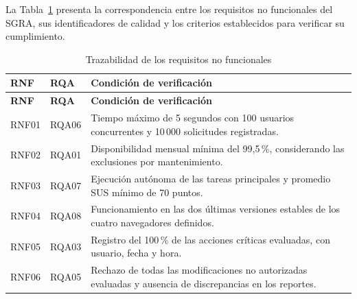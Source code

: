 La Tabla~\ref{tab:trazabilidad-rnf} presenta la correspondencia
entre los requisitos no funcionales del SGRA, sus identificadores
de calidad y los criterios establecidos para verificar su cumplimiento.

\begin{longtable}{@{}p{}p{}p{}@{}}
\caption{Trazabilidad de los requisitos no funcionales}
\label{tab:trazabilidad-rnf}\\
\toprule
\textbf{RNF} & \textbf{RQA} & \textbf{Condición de verificación}\\
\midrule
\endfirsthead

\toprule
\textbf{RNF} & \textbf{RQA} & \textbf{Condición de verificación}\\
\midrule
\endhead

RNF01 & RQA06 &
Tiempo máximo de 5 segundos con 100 usuarios concurrentes
y 10\,000 solicitudes registradas. \\

RNF02 & RQA01 &
Disponibilidad mensual mínima del 99,5\,\%,
considerando las exclusiones por mantenimiento. \\

RNF03 & RQA07 &
Ejecución autónoma de las tareas principales y
promedio SUS mínimo de 70 puntos. \\

RNF04 & RQA08 &
Funcionamiento en las dos últimas versiones
estables de los cuatro navegadores definidos. \\

RNF05 & RQA03 &
Registro del 100\,\% de las acciones críticas
evaluadas, con usuario, fecha y hora. \\

RNF06 & RQA05 &
Rechazo de todas las modificaciones no autorizadas
evaluadas y ausencia de discrepancias en los reportes. \\

\bottomrule
\end{longtable}
